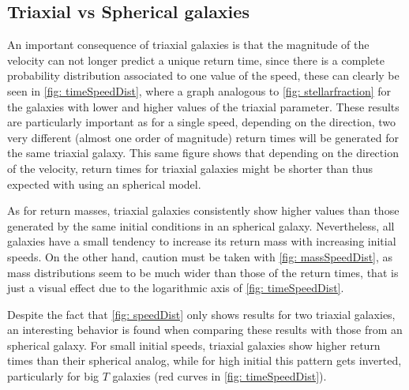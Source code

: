	\subsection{Triaxial vs Spherical galaxies}
	An important consequence of triaxial galaxies is that the magnitude of the velocity can not longer predict a unique return time, since there is a complete probability distribution associated to one value of the speed, these can clearly be seen in \autoref{fig: timeSpeedDist}, where a graph analogous to \autoref{fig: stellarfraction} for the galaxies with lower and higher values of the triaxial parameter. These results are particularly important as for a single speed, depending on the direction, two very different (almost one order of magnitude) return times will be generated for the same triaxial galaxy. This same figure shows that depending on the direction of the velocity, return times for triaxial galaxies might be shorter than thus expected with using an spherical model.
	
	As for return masses, triaxial galaxies consistently show higher values than those generated by the same initial conditions in an spherical galaxy. Nevertheless, all galaxies have a small tendency to increase its return mass with increasing initial speeds. On the other hand, caution must be taken with \autoref{fig: massSpeedDist}, as mass distributions seem to be much wider than those of the return times, that is just a visual effect due to the logarithmic axis of \autoref{fig: timeSpeedDist}. 
	
	Despite the fact that \autoref{fig: speedDist} only shows results for two triaxial galaxies, an interesting behavior is found when comparing these results with those from an spherical galaxy. For small initial speeds, triaxial galaxies show higher return times than their spherical analog, while for high initial this pattern gets inverted, particularly for big $T$ galaxies (red curves in \autoref{fig: timeSpeedDist}).
	
